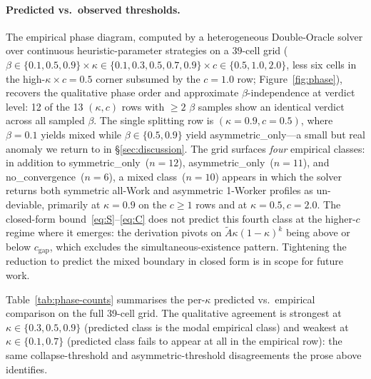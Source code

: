 \documentclass{anvil-paper}
\begin{document}
\paragraph{Predicted vs.\ observed thresholds.}
The empirical phase diagram, computed by a heterogeneous Double-Oracle
solver over continuous heuristic-parameter strategies on a $39$-cell grid
($\beta\in\{0.1,0.5,0.9\}\times\kappa\in\{0.1,0.3,0.5,0.7,0.9\}\times
c\in\{0.5,1.0,2.0\}$, less six cells in the high-$\kappa\times c{=}0.5$
corner subsumed by the $c{=}1.0$ row; Figure~\ref{fig:phase}), recovers the
qualitative phase order and approximate $\beta$-independence at verdict
level: 12 of the 13 $(\kappa,c)$ rows with $\geq 2$ $\beta$ samples
show an identical verdict across all sampled $\beta$. The single
splitting row is $(\kappa{=}0.9, c{=}0.5)$, where $\beta{=}0.1$
yields \textsf{mixed} while $\beta\in\{0.5, 0.9\}$ yield
\textsf{asymmetric\_only}---a small but real anomaly we return to in
\S\ref{sec:discussion}. The grid surfaces \emph{four}
empirical classes: in addition to \textsf{symmetric\_only}~($n{=}12$),
\textsf{asymmetric\_only}~($n{=}11$), and \textsf{no\_convergence}~($n{=}6$),
a \textsf{mixed} class~($n{=}10$) appears in which the solver returns both
symmetric all-Work and asymmetric 1-Worker profiles as un-deviable,
primarily at $\kappa{=}0.9$ on the $c{\geq}1$ rows and at $\kappa{=}0.5,
c{=}2.0$. The closed-form bound~\eqref{eq:S}--\eqref{eq:C} does not predict
this fourth class at the higher-$c$ regime where it emerges: the derivation
pivots on $\tilde A\kappa(1-\kappa)^{k}$ being above or below
$c_{\text{gap}}$, which excludes the simultaneous-existence pattern.
Tightening the reduction to predict the \textsf{mixed} boundary in closed
form is in scope for future work.

Table~\ref{tab:phase-counts} summarises the per-$\kappa$ predicted
vs.\ empirical comparison on the full 39-cell grid. The qualitative
agreement is strongest at $\kappa\in\{0.3, 0.5, 0.9\}$ (predicted
class is the modal empirical class) and weakest at $\kappa\in\{0.1, 0.7\}$
(predicted class fails to appear at all in the empirical row): the same
collapse-threshold and asymmetric-threshold disagreements the prose
above identifies.
\end{document}
